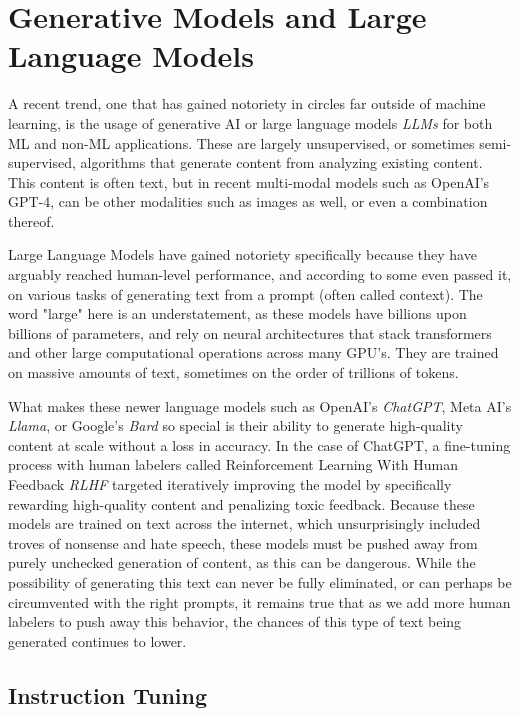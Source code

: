 
\section{Generative Models and Large Language Models}

A recent trend, one that has gained notoriety in circles far outside of machine learning, is the usage of generative AI
or large language models \textit{LLMs} for both ML and non-ML applications. These are largely unsupervised, or sometimes
semi-supervised, algorithms that generate content from analyzing existing content. This content is often text, but in recent
multi-modal models such as OpenAI's GPT-4\cite{openai2023gpt4}, can be other modalities such as images as well, or even a combination thereof.

Large Language Models have gained notoriety specifically because they have arguably reached human-level performance, and according
to some even passed it, on various tasks of generating text from a prompt (often called context). The word "large" here is an understatement,
as these models have billions upon billions of parameters, and rely on neural architectures that stack transformers and other large
computational operations across many GPU's. They are trained on massive amounts of text, sometimes on the order of trillions\cite{touvron2023llama} of tokens.

What makes these newer language models such as OpenAI's \textit{ChatGPT}, Meta AI's \textit{Llama}\cite{touvron2023llama}, or Google's \textit{Bard} so special
is their ability to generate high-quality content at scale without a loss in accuracy. In the case of ChatGPT, a fine-tuning process with
human labelers called Reinforcement Learning With Human Feedback \textit{RLHF} targeted iteratively improving the model by specifically
rewarding high-quality content and penalizing toxic feedback. Because these models are trained on text across the internet, which
unsurprisingly included troves of nonsense and hate speech, these models must be pushed away from purely unchecked generation of content,
as this can be dangerous. While the possibility of generating this text can never be fully eliminated, or can perhaps be circumvented with the right prompts, it remains true
that as we add more human labelers to push away this behavior, the chances of this type of text being generated continues to lower.

\subsection{Instruction Tuning}

